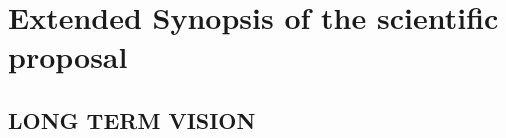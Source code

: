 \section{Extended Synopsis of the scientific proposal}





\vspace{-3ex}


\subsection*{LONG TERM VISION} %

%
\vspace{-3ex}

